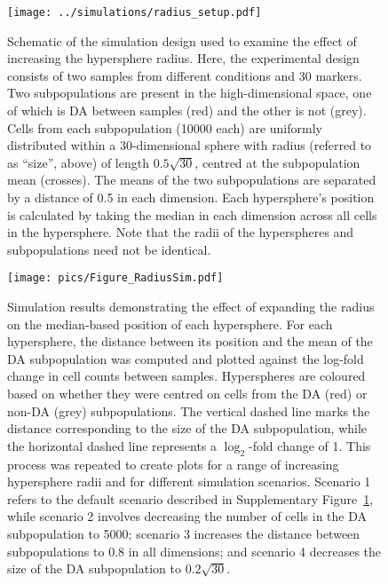 \documentclass{article}
\begin{document}
\begin{figure}[tbp]
    \begin{center}
        \texttt{[image: ../simulations/radius\_setup.pdf]}
    \end{center}
    \caption{Schematic of the simulation design used to examine the effect of increasing the hypersphere radius.
        Here, the experimental design consists of two samples from different conditions and 30 markers.
        Two subpopulations are present in the high-dimensional space, one of which is DA between samples (red) and the other is not (grey).
        Cells from each subpopulation (10000 each) are uniformly distributed within a 30-dimensional sphere with radius (referred to as ``size'', above) of length $0.5\sqrt{30}$, centred at the subpopulation mean (crosses).
        The means of the two subpopulations are separated by a distance of 0.5 in each dimension.
        Each hypersphere's position is calculated by taking the median in each dimension across all cells in the hypersphere.
        Note that the radii of the hyperspheres and subpopulations need not be identical.
    }
    \label{fig:radius_schematic}
\end{figure}

\begin{figure}[tbp]
    \begin{center}
        \texttt{[image: pics/Figure\_RadiusSim.pdf]}
    \end{center}
    \caption{Simulation results demonstrating the effect of expanding the radius on the median-based position of each hypersphere.
        For each hypersphere, the distance between its position and the mean of the DA subpopulation was computed and plotted against the log-fold change in cell counts between samples.
        Hyperspheres are coloured based on whether they were centred on cells from the DA (red) or non-DA (grey) subpopulations.
        The vertical dashed line marks the distance corresponding to the size of the DA subpopulation, while the horizontal dashed line represents a $\log_2$-fold change of 1.
        This process was repeated to create plots for a range of increasing hypersphere radii and for different simulation scenarios.
        Scenario 1 refers to the default scenario described in Supplementary Figure~\ref{fig:radius_schematic}, while scenario 2 involves decreasing the number of cells in the DA subpopulation to 5000; scenario 3 increases the distance between subpopulations to 0.8 in all dimensions; and scenario 4 decreases the size of the DA subpopulation to $0.2\sqrt{30}$.
    }
    \label{fig:radius_position}
\end{figure}
\end{document}
